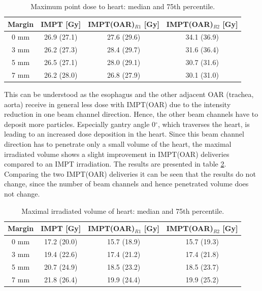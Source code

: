 \begin{table}[H]
  \centering
    \footnotesize
  \caption{Maximum point dose to heart: median and 75th percentile.}
  \begin{tabular}{|c||c|c|c|}
    \hline\hline
      Margin & IMPT [Gy] & IMPT(OAR)$_{R1}$ [Gy] & IMPT(OAR)$_{R2}$ [Gy]\\
    \hline
    0 mm & 26.9 (27.1) & 27.6 (29.6) & 34.1 (36.9) \\
    3 mm & 26.2 (27.3) & 28.4 (29.7) & 31.6 (36.4) \\
    5 mm & 26.5 (27.1) & 28.0 (29.1) & 30.7 (31.6) \\
    7 mm & 26.2 (28.0) & 26.8 (27.9) & 30.1 (31.0) \\
    \hline\hline
  \end{tabular}
  \label{tab:maxdose_heart}
\end{table}

This can be understood as the esophagus and the other adjacent 
OAR (trachea, aorta) receive in general less dose with IMPT(OAR) due to the intensity reduction in one beam channel direction. Hence, the other 
beam channels have to deposit more particles. Especially gantry angle 0$^{\circ}$, which traverses the heart, is leading to an 
increased dose deposition in the heart. Since this beam channel direction has to penetrate only a small volume of the heart, the maximal 
irradiated volume shows a slight improvement in IMPT(OAR) deliveries compared to an IMPT irradiation. The results are 
presented in table \ref{tab:maxvolume_heart}. Comparing the two IMPT(OAR) deliveries it can be seen that the results do not change, 
since the number of beam channels and hence penetrated volume does not change. 


\vspace*{-0.3cm}

\begin{table}[H]
  \centering
    \footnotesize
  \caption{Maximal irradiated volume of heart: median and 75th percentile.}
  \begin{tabular}{|c||c|c|c|}
    \hline\hline
      Margin & IMPT [Gy] & IMPT(OAR)$_{R1}$ [Gy] & IMPT(OAR)$_{R2}$ [Gy]\\
    \hline
    0 mm & 17.2 (20.0) & 15.7 (18.9) & 15.7 (19.3) \\
    3 mm & 19.4 (22.6) & 17.4 (21.2) & 17.4 (21.8) \\
    5 mm & 20.7 (24.9) & 18.5 (23.2) & 18.5 (23.7) \\
    7 mm & 21.8 (26.4) & 19.9 (24.4) & 19.9 (25.2) \\
    \hline\hline
  \end{tabular}
  \label{tab:maxvolume_heart}
\end{table}


